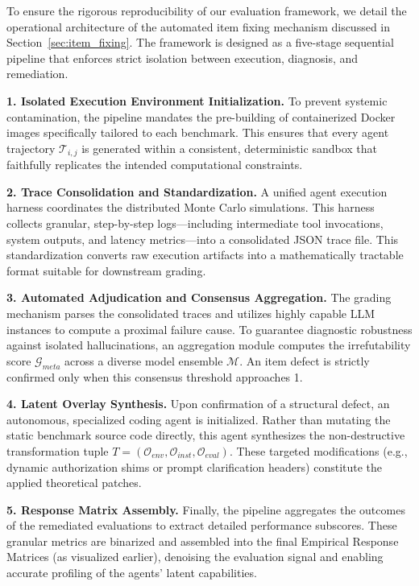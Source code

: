 \documentclass{article}
\theoremstyle{plain}
\theoremstyle{definition}
\theoremstyle{remark}
\begin{document}
To ensure the rigorous reproducibility of our evaluation framework, we detail the operational architecture of the automated item fixing mechanism discussed in Section~\ref{sec:item_fixing}. The framework is designed as a five-stage sequential pipeline that enforces strict isolation between execution, diagnosis, and remediation.

\textbf{1. Isolated Execution Environment Initialization.} To prevent systemic contamination, the pipeline mandates the pre-building of containerized Docker images specifically tailored to each benchmark. This ensures that every agent trajectory $\mathcal{T}_{i,j}$ is generated within a consistent, deterministic sandbox that faithfully replicates the intended computational constraints.

\textbf{2. Trace Consolidation and Standardization.} A unified agent execution harness coordinates the distributed Monte Carlo simulations. This harness collects granular, step-by-step logs---including intermediate tool invocations, system outputs, and latency metrics---into a consolidated JSON trace file. This standardization converts raw execution artifacts into a mathematically tractable format suitable for downstream grading.

\textbf{3. Automated Adjudication and Consensus Aggregation.} The grading mechanism parses the consolidated traces and utilizes highly capable LLM instances to compute a proximal failure cause. To guarantee diagnostic robustness against isolated hallucinations, an aggregation module computes the irrefutability score $\mathcal{G}_{meta}$ across a diverse model ensemble $\mathcal{M}$. An item defect is strictly confirmed only when this consensus threshold approaches 1.

\textbf{4. Latent Overlay Synthesis.} Upon confirmation of a structural defect, an autonomous, specialized coding agent is initialized. Rather than mutating the static benchmark source code directly, this agent synthesizes the non-destructive transformation tuple $T = (\mathcal{O}_{env}, \mathcal{O}_{inst}, \mathcal{O}_{eval})$. These targeted modifications (e.g., dynamic authorization shims or prompt clarification headers) constitute the applied theoretical patches.

\textbf{5. Response Matrix Assembly.} Finally, the pipeline aggregates the outcomes of the remediated evaluations to extract detailed performance subscores. These granular metrics are binarized and assembled into the final Empirical Response Matrices (as visualized earlier), denoising the evaluation signal and enabling accurate profiling of the agents' latent capabilities.
\end{document}
